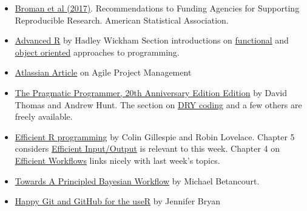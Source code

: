 \documentclass[
  letterpaper,
  DIV=11,
  numbers=noendperiod]{scrreprt}
\providecommand{\tightlist}{%
  \setlength{\itemsep}{0pt}\setlength{\parskip}{0pt}}\usepackage{longtable,booktabs,array}
\begin{document}
\begin{itemize}
\tightlist
\item
  \href{https://www.amstat.org/docs/default-source/amstat-documents/pol-reproducibleresearchrecommendations.pdf}{Broman
  et al (2017)}. Recommendations to Funding Agencies for Supporting
  Reproducible Research. American Statistical Association.
\end{itemize}

\begin{itemize}
\item
  \href{https://adv-r.hadley.nz/}{Advanced R} by Hadley Wickham Section
  introductions on \href{https://adv-r.hadley.nz/fp.html}{functional}
  and \href{https://adv-r.hadley.nz/oo.html}{object oriented} approaches
  to programming.
\item
  \href{https://www.atlassian.com/agile/project-management}{Atlassian
  Article} on Agile Project Management
\end{itemize}

\begin{itemize}
\tightlist
\item
  \href{https://pragprog.com/titles/tpp20/the-pragmatic-programmer-20th-anniversary-edition/}{The
  Pragmatic Programmer, 20th Anniversary Edition Edition} by David
  Thomas and Andrew Hunt. The section on
  \href{https://media.pragprog.com/titles/tpp20/dry.pdf}{DRY coding} and
  a few others are freely available.
\end{itemize}

\begin{itemize}
\item
  \href{https://csgillespie.github.io/efficientR/}{Efficient R
  programming} by Colin Gillespie and Robin Lovelace. Chapter 5
  considers
  \href{https://csgillespie.github.io/efficientR/input-output.html}{Efficient
  Input/Output} is relevant to this week. Chapter 4 on
  \href{https://csgillespie.github.io/efficientR/workflow.html}{Efficient
  Workflows} links nicely with last week's topics.
\item
  \href{https://betanalpha.github.io/assets/case_studies/principled_bayesian_workflow.html\#References}{Towards
  A Principled Bayesian Workflow} by Michael Betancourt.
\end{itemize}

\begin{itemize}
\tightlist
\item
  \href{https://happygitwithr.com/}{Happy Git and GitHub for the useR}
  by Jennifer Bryan
\end{itemize}
\end{document}

